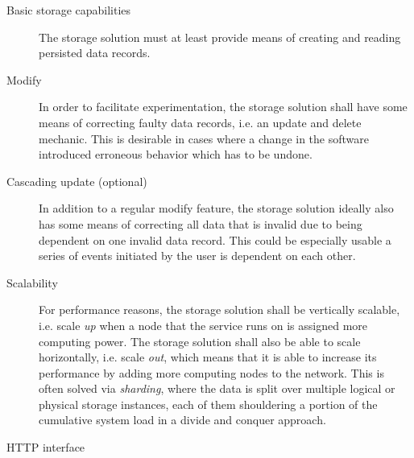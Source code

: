 \begin{description}
\item [Basic storage capabilities]
The storage solution must at least provide means of creating and reading persisted data records.
\item [Modify]
In order to facilitate experimentation, the storage solution shall have some means of correcting faulty data records, i.e. an update and delete mechanic.
This is desirable in cases where a change in the software introduced erroneous behavior which has to be undone.
\item [Cascading update (optional)]
In addition to a regular modify feature, the storage solution ideally also has some means of correcting all data that is invalid due to being dependent on one invalid data record.
This could be especially usable a series of events initiated by the user is dependent on each other.
\item [Scalability]
For performance reasons, the storage solution shall be vertically scalable, i.e. scale \emph{up} when a node that the service runs on is assigned more computing power.
The storage solution shall also be able to scale horizontally, i.e. scale \emph{out}, which means that it is able to increase its performance by adding more computing nodes to the network.
This is often solved via \emph{sharding}, where the data is split over multiple logical or physical storage instances, each of them shouldering a portion of the cumulative system load in a divide and conquer approach.
\item [HTTP interface]

\end{description}
